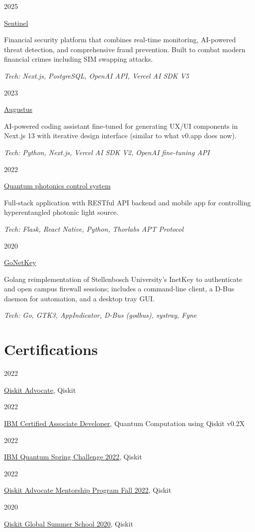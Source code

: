 \documentclass[9pt]{extreport}
\newcommand{\listitemspace}{0.25em}
\renewenvironment{itemize}
{\begin{list}{}{
    \setlength{\leftmargin}{0em}
    \setlength{\parskip}{0em}
    \setlength{\itemsep}{\listitemspace}
    \setlength{\parsep}{\listitemspace}}}
{\end{list}}
\newcommand{\entry}[2]{%
  \noindent%
  \begin{minipage}[t]{2.25cm}%
    \raggedright #1%
  \end{minipage}%
  \hspace{0.4cm}%
  \begin{minipage}[t]{\dimexpr\textwidth-2cm\relax}%
    #2%
  \end{minipage}%
  \vspace{0.25cm}%
}
\begin{document}
\entry{2025}{\href{https://github.com/ThamuMnyulwa/bet-hackathon-2025}{Sentinel}
\begin{itemize}
  \item Financial security platform that combines real-time monitoring, AI-powered threat detection, and comprehensive fraud prevention. Built to combat modern financial crimes including SIM swapping attacks.
  \item \textit{Tech: Next.js, PostgreSQL, OpenAI API, Vercel AI SDK V5}
\end{itemize}}

\entry{2023}{\href{https://github.com/Unathi-Skosana/augustus}{Augustus}
\begin{itemize}
    \item AI-powered coding assistant fine-tuned for generating UX/UI components in Next.js 13 with iterative design interface (similar to what v0.app does now).
    \item \textit{Tech: Python, Next.js, Vercel AI SDK V2, OpenAI fine-tuning API}
\end{itemize}}

\entry{2022}{\href{https://github.com/Unathi-Skosana/hyperentangled-photons-masters-experiment}{Quantum photonics control system}
\begin{itemize}
    \item Full-stack application with RESTful API backend and mobile app for controlling hyperentangled photonic light source.
    \item \textit{Tech: Flask, React Native, Python, Thorlabs APT Protocol}
\end{itemize}}
\entry{2020}{\href{https://github.com/Unathi-Skosana/gonetkey}{GoNetKey}
  \begin{itemize}
  \item Golang reimplementation of Stellenbosch University's InetKey to authenticate and open campus firewall sessions; includes a command-line client, a D-Bus daemon for automation, and a desktop tray GUI. 
  \item \textit{Tech: Go, GTK3, AppIndicator, D-Bus (godbus), systray, Fyne}
\end{itemize}}

\section*{Certifications}

\entry{2022}{\href{https://www.credly.com/badges/1572414f-9c43-4bab-909b-be4abf516ae3/public_url}{Qiskit Advocate}, Qiskit}

\entry{2022}{\href{https://www.credly.com/badges/055e900b-ec8b-428c-b0aa-854695b17bef/public_url}{IBM Certified Associate Developer}, Quantum Computation using Qiskit v0.2X}

\entry{2022}{\href{https://www.credly.com/badges/ca639522-d9e4-412d-be79-95c3a0819c29/public_url}{IBM Quantum Spring Challenge 2022}, Qiskit}

\entry{2022}{\href{https://www.credly.com/badges/42753d82-8fcc-4f50-8068-c30cd510c286/public_url}{Qiskit Advocate Mentorship Program Fall 2022}, Qiskit}

\entry{2020}{\href{https://www.credly.com/badges/1572414f-9c43-4bab-909b-be4abf516ae3/public_url}{Qiskit Global Summer School 2020}, Qiskit}
\end{document}
